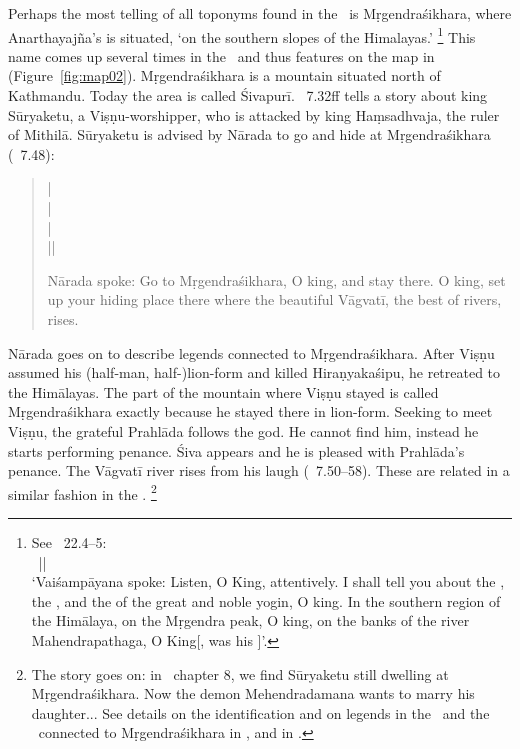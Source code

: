 Perhaps the most telling of all toponyms found
in the \VSS\ is Mṛgendra\-śikhara,\label{anarthayajnas_asrama} where Anarthayajña's  is situated,
`on the southern slopes of the Himalayas.'%
		\footnote{\label{mrgendrasikhara}See \VSS\ 22.4--5:\\
     		~||\\
			`Vaiśampāyana spoke: Listen, O King, attentively.
		  	I shall tell you about the , 
		  	the , and the  of the
		  	great and noble yogin, O king.
		  	In the southern region of the Himālaya, 
		  	on the Mṛgendra peak, O king,
		  	on the banks of the river Mahendrapathaga, O King[,
		  	was his ]'.}
This name comes up several times in the \NepMah\ and thus features on
the map in 
(Figure~\ref{fig:map02}). Mṛge\-ndra\-śikhara is a mountain
situated north of Kathmandu. Today the area is
called Śivapurī. \NepMah\ 7.32ff tells a story about king Sūryaketu, a Viṣṇu-worshipper,
who is attacked by king Haṃsadhvaja, the ruler of Mithilā. Sūryaketu is advised by Nārada
to go and hide at Mṛgendraśikhara (\NepMah\ 7.48):

\begin{quote}
 |\\
 |\\
 |\\
 ||

Nārada spoke:
Go to Mṛgendraśikhara, O king, and stay there.
O king, set up your hiding place there
where the beautiful Vāgvatī, the best of rivers, rises.
\end{quote}

\noindent
Nārada goes on to describe legends connected to Mṛgendraśikhara. 
After Viṣṇu assumed his (half-man, half-)lion-form and killed Hiraṇyakaśipu,
he retreated to the Himālayas. 
The part of the mountain where Viṣṇu stayed is called Mṛgendraśikhara exactly 
because he stayed there in lion-form.
Seeking to meet Viṣṇu, the grateful Prahlāda follows the god. 
He cannot find him, instead he starts performing penance.
Śiva appears and he is pleased with Prahlāda's penance. 
The Vāgvatī river rises from his laugh (\NepMah\ 7.50--58).
These are related in a similar fashion in the
\Vagmati.%
         \footnote{The story goes on: 
        in \NepMah\ chapter 8, we find Sūryaketu still dwelling at Mṛgendraśikhara. 
        Now the demon Mehendradamana wants to marry his daughter...
        See details on the identification and
        on legends in the \NepMah\ and the \Vagmati\ connected to Mṛgendraśikhara in
        , and in
        .}

